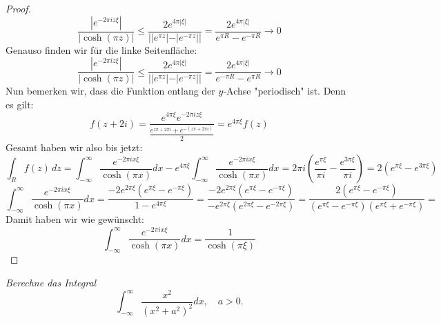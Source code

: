 \documentclass[11pt]{article}
\newenvironment{problem}[2][Beispiel]{
    \begin{trivlist}
        \item[\hskip \labelsep {\bfseries #1}\hskip \labelsep {\bfseries #2.}] \itshape}{
    \end{trivlist}\normalshape
}
\begin{document}
\begin{proof}
        $$\frac{|e^{-2 \pi i z \xi}|}{|\cosh (\pi z)|}\leq \frac{2e^{4\pi|\xi| }}{||e^{\pi z}|-|e^{-\pi z}||}
        = \frac{2e^{4\pi|\xi| }}{e^{\pi R}-e^{-\pi R}}\to 0$$
        Genauso finden wir für die linke Seitenfläche:
        $$\frac{|e^{-2 \pi i z \xi}|}{|\cosh (\pi z)|}\leq \frac{2e^{4\pi|\xi|}}{||e^{\pi z}|-|e^{-\pi z}||}
        = \frac{2e^{4\pi|\xi| }}{e^{-\pi R}-e^{\pi R}}\to 0$$
        Nun bemerken wir, dass die Funktion entlang der $y$-Achse "periodisch" ist. Denn es gilt:
        $$f(z+2i) = \frac{e^{4\pi \xi}e^{-2 \pi i z \xi}}{\frac{e^{z\pi+2\pi i} + e^{-(z\pi + 2\pi i)}}{2}}
        = e^{4\pi \xi} f(z)$$
        Gesamt haben wir also bis jetzt:
        $$\int_{R} f(z)\,dz = \int_{-\infty}^{\infty} \frac{e^{-2 \pi i x \xi}}{\cosh (\pi x)} d x -
        e^{4\pi \xi}\int_{-\infty}^{\infty} \frac{e^{-2 \pi i x \xi}}{\cosh (\pi x)} d x
        = 2\pi i\left(\frac{e^{\pi \xi}}{\pi i}-\frac{e^{3\pi \xi}}{\pi i}\right) =
        2(e^{\pi \xi}-e^{3\pi \xi})$$
        $$\int_{-\infty}^{\infty} \frac{e^{-2 \pi i x \xi}}{\cosh (\pi x)} d x =
        \frac{-2e^{2\pi\xi}(e^{\pi \xi}-e^{-\pi \xi})}{1-e^{4\pi \xi}} =
        \frac{-2e^{2\pi\xi}(e^{\pi \xi}-e^{-\pi \xi})}{-e^{2\pi\xi}(e^{2\pi\xi}-e^{-2\pi\xi})}
        = \frac{2(e^{\pi \xi}-e^{-\pi \xi})}{(e^{\pi\xi}-e^{-\pi\xi})(e^{\pi\xi}+e^{-\pi\xi})}=$$
        Damit haben wir wie gewünscht:
        $$\int_{-\infty}^{\infty} \frac{e^{-2 \pi i x \xi}}{\cosh (\pi x)} d x=
        \frac{1}{\cosh (\pi \xi)}$$
    \end{proof}

    \begin{problem}{2}
        Berechne das Integral
        $$
        \int_{-\infty}^{\infty} \frac{x^2}{\left(x^2+a^2\right)^2} d x, \quad a>0 .
        $$
    \end{problem}
\end{document}
